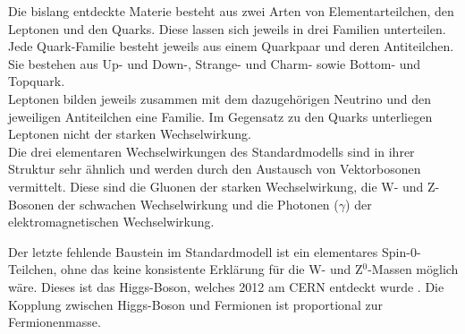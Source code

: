 
Die bislang entdeckte Materie besteht aus zwei Arten von Elementarteilchen, den Leptonen und den Quarks. Diese lassen sich jeweils in drei Familien unterteilen. Jede Quark-Familie besteht jeweils aus einem Quarkpaar und deren Antiteilchen. Sie bestehen aus Up- und Down-, Strange- und Charm- sowie Bottom- und Topquark.\\
Leptonen bilden jeweils zusammen mit dem dazugeh\"origen Neutrino und den jeweiligen Antiteilchen eine Familie. Im Gegensatz zu den Quarks unterliegen Leptonen nicht der starken Wechselwirkung.\\
Die drei elementaren Wechselwirkungen des Standardmodells sind in ihrer Struktur sehr \"ahnlich und werden durch den Austausch von Vektorbosonen vermittelt. Diese sind die Gluonen der starken Wechselwirkung, die W- und Z-Bosonen der schwachen Wechselwirkung und die Photonen ($\gamma$) der elektromagnetischen Wechselwirkung.%

Der letzte fehlende Baustein im Standardmodell ist ein elementares Spin-0-Teilchen, ohne das keine konsistente Erkl\"arung f\"ur die W- und Z$^0$-Massen m\"oglich w\"are. Dieses ist das Higgs-Boson, welches 2012 am CERN entdeckt wurde \cite{Chatrchyan201230}\cite{Aad20121}. Die Kopplung zwischen Higgs-Boson und Fermionen ist proportional zur Fermionenmasse.

